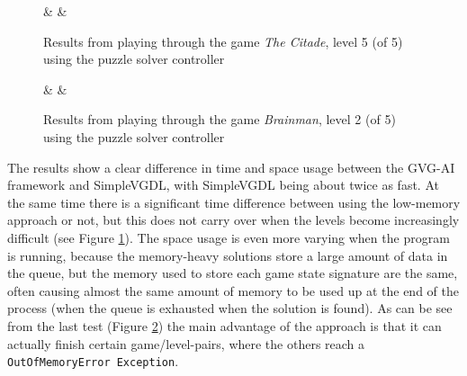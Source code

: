 \documentclass[a4paper,titlepage,final]{report}
\begin{document}
 \begin{figure}[!ht]
\centering
{}%
{\Framwork & \Time & \Space}%
\caption{Results from playing through the game \textit{The Citade}, level 5 (of 5) using the puzzle solver controller}\label{table:fastvgdlthecitadel4}
\end{figure}

 \begin{figure}[!ht]
\centering
{}%
{\Framwork & \Time & \Space}%
\caption{Results from playing through the game \textit{Brainman}, level 2 (of 5) using the puzzle solver controller}\label{table:fastvgdlbrainman1}
\end{figure}


The results show a clear difference in time and space usage between the GVG-AI framework and SimpleVGDL, with SimpleVGDL being about twice as fast.
At the same time there is a significant time difference between using the low-memory approach or not, but this does not carry over when the levels become increasingly difficult (see Figure \ref{table:fastvgdlthecitadel4}).
The space usage is even more varying when the program is running, because the memory-heavy solutions store a large amount of data in the queue, but the memory used to store each game state signature are the same, often causing almost the same amount of memory to be used up at the end of the process (when the queue is exhausted when the solution is found).
As can be see from the last test (Figure \ref{table:fastvgdlbrainman1}) the main advantage of the approach is that it can actually finish certain game/level-pairs, where the others reach a \texttt{OutOfMemoryError Exception}.
\end{document}
